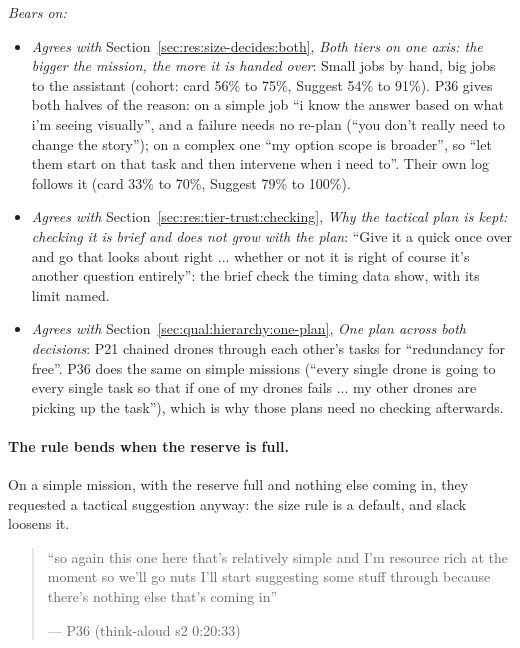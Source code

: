 \noindent\textit{Bears on:}
\begin{itemize}[leftmargin=1.2em,itemsep=1pt]\small
\item \textit{Agrees with} Section~\ref{sec:res:size-decides:both}, \emph{Both tiers on one axis: the bigger the mission, the more it is handed over}: Small jobs by hand, big jobs to the assistant (cohort: card 56\% to 75\%, Suggest 54\% to 91\%). P36 gives both halves of the reason: on a simple job ``i know the answer based on what i'm seeing visually'', and a failure needs no re-plan (``you don't really need to change the story''); on a complex one ``my option scope is broader'', so ``let them start on that task and then intervene when i need to''. Their own log follows it (card 33\% to 70\%, Suggest 79\% to 100\%).
\item \textit{Agrees with} Section~\ref{sec:res:tier-trust:checking}, \emph{Why the tactical plan is kept: checking it is brief and does not grow with the plan}: ``Give it a quick once over and go that looks about right ... whether or not it is right of course it's another question entirely'': the brief check the timing data show, with its limit named.
\item \textit{Agrees with} Section~\ref{sec:qual:hierarchy:one-plan}, \emph{One plan across both decisions}: P21 chained drones through each other's tasks for ``redundancy for free''. P36 does the same on simple missions (``every single drone is going to every single task so that if one of my drones fails ... my other drones are picking up the task''), which is why those plans need no checking afterwards.
\end{itemize}


\label{sec:qual:practitioner:pt-resource-rich}\paragraph{The rule bends when the reserve is full.}
On a simple mission, with the reserve full and nothing else coming in, they requested a tactical suggestion anyway: the size rule is a default, and slack loosens it.

\begin{quote}\small
``so again this one here that's relatively simple and I'm resource rich at the moment so we'll go nuts I'll start suggesting some stuff through because there's nothing else that's coming in''\par\hfill--- P36 (think-aloud s2 0:20:33)
\end{quote}

